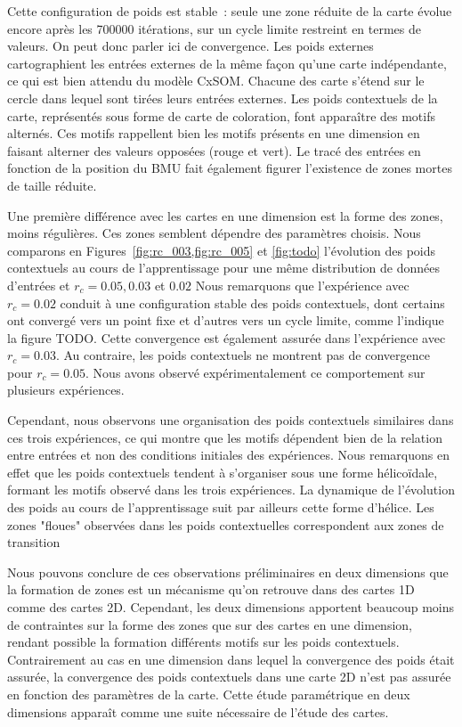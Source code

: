 \documentclass[../main]{subfiles}
\begin{document}
Cette configuration de poids est stable~: seule une zone réduite de la carte évolue encore après les 700000 itérations, sur un cycle limite restreint en termes de valeurs. 
On peut donc parler ici de convergence.
Les poids externes cartographient les entrées externes de la même façon qu'une carte indépendante, ce qui est bien attendu du modèle CxSOM. Chacune des carte s'étend sur le cercle dans lequel sont tirées leurs entrées externes.
Les poids contextuels de la carte, représentés sous forme de carte de coloration, font apparaître des motifs alternés.
Ces motifs rappellent bien les motifs présents en une dimension en faisant alterner des valeurs opposées (rouge et vert).
Le tracé des entrées en fonction de la position du BMU fait également figurer l'existence de zones mortes de taille réduite.


Une première différence avec les cartes en une dimension est la forme des zones, moins régulières. Ces zones semblent dépendre des paramètres choisis.
Nous comparons en Figures~\ref{fig:rc_003,fig:rc_005} et \ref{fig:todo} l'évolution des poids contextuels au cours de l'apprentissage pour une même distribution de données d'entrées et $r_c = 0.05, 0.03$ et $0.02$
Nous remarquons que l'expérience avec $r_c = 0.02$ conduit à une configuration stable des poids contextuels, dont certains ont convergé vers un point fixe et d'autres vers un cycle limite, comme l'indique la figure TODO. Cette convergence est également assurée dans l'expérience avec $r_c = 0.03$. Au contraire, les poids contextuels ne montrent pas de convergence pour $r_c =0.05$. Nous avons observé expérimentalement ce comportement sur plusieurs expériences.

Cependant, nous observons une organisation des poids contextuels similaires dans ces trois expériences, ce qui montre que les motifs dépendent bien de la relation entre entrées et non des conditions initiales des expériences. 
Nous remarquons en effet que les poids contextuels tendent à s'organiser sous une forme hélicoïdale, formant les motifs observé dans les trois expériences.
La dynamique de l'évolution des poids au cours de l'apprentissage suit par ailleurs cette forme d'hélice. 
Les zones "floues" observées dans les poids contextuelles correspondent aux zones de transition

Nous pouvons conclure de ces observations préliminaires en deux dimensions que la formation de zones est un mécanisme qu'on retrouve dans des cartes 1D comme des cartes 2D. Cependant, les deux dimensions apportent beaucoup moins de contraintes sur la forme des zones que sur des cartes en une dimension, rendant possible la formation différents motifs sur les poids contextuels. 
Contrairement au cas en une dimension dans lequel la convergence des poids était assurée, la convergence des poids contextuels dans une carte 2D n'est pas assurée en fonction des paramètres de la carte. Cette étude paramétrique en deux dimensions apparaît comme une suite nécessaire de l'étude des cartes.
\end{document}
